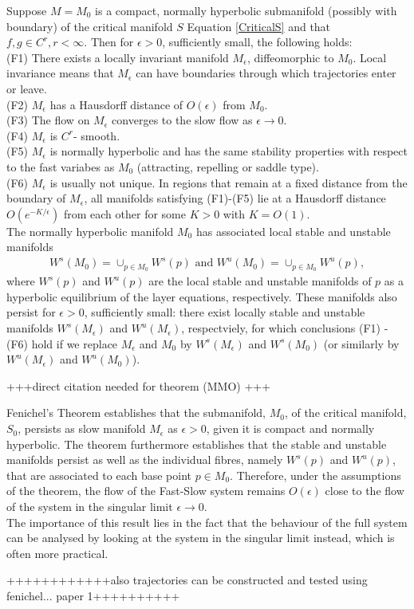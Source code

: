 \begin{theorem} \label{Fenichel}	
	Suppose $M=M_0$ is a compact, normally hyperbolic submanifold  (possibly with boundary) of the critical manifold $S$ Equation \ref{CriticalS} and  that $f, g \in C^r, r < \infty $. Then for $\epsilon >0$, sufficiently small, the following holds:\\
	(F1) There exists a locally invariant manifold $M_{\epsilon}$, diffeomorphic to  $M_0$. Local invariance means that $M_{\epsilon}$ can have boundaries through which trajectories enter or leave.\\
	(F2) $M_{\epsilon}$ has a Hausdorff distance of $O(\epsilon)$ from $M_0$.\\
	(F3) The flow on $M_{\epsilon}$  converges to the slow flow as $\epsilon \to 0$.\\
	(F4) $M_{\epsilon}$ is $C^r$- smooth.\\
	(F5) $M_{\epsilon}$ is normally hyperbolic and has the same stability properties with respect to the fast variabes as $M_0$ (attracting, repelling or saddle type).\\
	(F6) $M_{\epsilon}$ is usually not unique. In regions that remain at a fixed distance from the boundary of  $M_{\epsilon}$, all manifolds satisfying (F1)-(F5) lie at a Hausdorff distance $O(e^{-K/\epsilon})$ from each other for some $K>0$ with $K=O(1)$.\\
	The normally hyperbolic manifold $M_0$ has associated local stable and unstable manifolds
	\begin{align*}
	W^s(M_0) =\cup_{p \in M_0} W^s(p) \textrm{\ \ and\ \ } W^u(M_0) =\cup_{p \in M_0} W^u(p),
	\end{align*}
	where  $W^s(p)$ and $W^u(p)$ are the local stable and unstable manifolds of $p$ as a hyperbolic equilibrium of the layer equations, respectively. These manifolds also persist for $\epsilon > 0$, sufficiently small: there exist locally stable and unstable manifolds $W^s(M_\epsilon)$ and $W^u(M_\epsilon)$, respectviely, for which conclusions (F1) - (F6) hold if we replace $M_\epsilon$ and $M_0$ by  $W^s(M_\epsilon)$ and $W^s(M_0)$ (or similarly by  $W^u(M_\epsilon)$ and $W^u(M_0)$).
\end{theorem} +++direct citation needed for theorem (MMO) +++

Fenichel's Theorem establishes that the submanifold, $M_0$, of the critical manifold, $S_0$, persists as slow manifold $M_\epsilon$ as $\epsilon >0$, given it is compact and normally hyperbolic. The theorem furthermore establishes that the stable and unstable manifolds persist as well as the individual fibres, namely $W^s(p)$ and $W^u(p)$, that are associated to each base point $p \in M_0$.
Therefore, under the assumptions of the theorem, the flow of the Fast-Slow system remains $O(\epsilon)$ close to the flow of the system in the singular limit $\epsilon \to 0$.\\

The importance of this result lies in the fact that the behaviour of the full system can be analysed by looking at the system in the singular limit instead, which is often more practical.


++++++++++++also trajectories can be constructed and tested using fenichel... paper 1++++++++++


